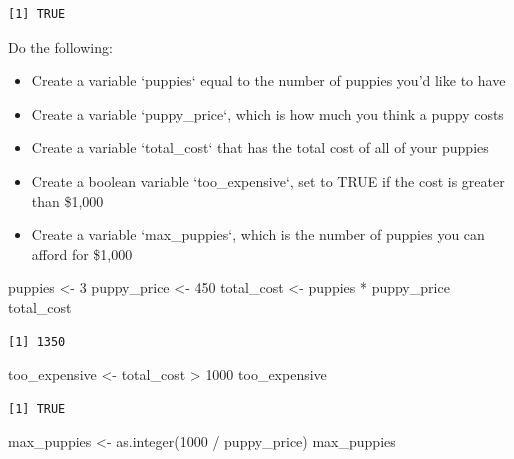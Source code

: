 \documentclass[
  letterpaper,
  DIV=11,
  numbers=noendperiod]{scrartcl}
\newenvironment{Shaded}{\begin{snugshade}}{\end{snugshade}}
\newcommand{\DecValTok}[1]{\textcolor[rgb]{0.68,0.00,0.00}{#1}}
\newcommand{\FunctionTok}[1]{\textcolor[rgb]{0.28,0.35,0.67}{#1}}
\newcommand{\NormalTok}[1]{\textcolor[rgb]{0.00,0.23,0.31}{#1}}
\newcommand{\OtherTok}[1]{\textcolor[rgb]{0.00,0.23,0.31}{#1}}
\newcommand{\SpecialCharTok}[1]{\textcolor[rgb]{0.37,0.37,0.37}{#1}}
\begin{document}
\begin{verbatim}
[1] TRUE
\end{verbatim}

Do the following:

\begin{itemize}
\item
  Create a variable `puppies` equal to the number of puppies you'd like
  to have
\item
  Create a variable `puppy\_price`, which is how much you think a puppy
  costs
\item
  Create a variable `total\_cost` that has the total cost of all of your
  puppies
\item
  Create a boolean variable `too\_expensive`, set to TRUE if the cost is
  greater than \$1,000
\item
  Create a variable `max\_puppies`, which is the number of puppies you
  can afford for \$1,000
\end{itemize}

\begin{Shaded}
\begin{Highlighting}[]
\NormalTok{puppies }\OtherTok{\textless{}{-}} \DecValTok{3}
\NormalTok{puppy\_price }\OtherTok{\textless{}{-}} \DecValTok{450}
\NormalTok{total\_cost }\OtherTok{\textless{}{-}}\NormalTok{ puppies }\SpecialCharTok{*}\NormalTok{ puppy\_price}
\NormalTok{total\_cost}
\end{Highlighting}
\end{Shaded}

\begin{verbatim}
[1] 1350
\end{verbatim}

\begin{Shaded}
\begin{Highlighting}[]
\NormalTok{too\_expensive }\OtherTok{\textless{}{-}}\NormalTok{ total\_cost }\SpecialCharTok{\textgreater{}} \DecValTok{1000}
\NormalTok{too\_expensive}
\end{Highlighting}
\end{Shaded}

\begin{verbatim}
[1] TRUE
\end{verbatim}

\begin{Shaded}
\begin{Highlighting}[]
\NormalTok{max\_puppies }\OtherTok{\textless{}{-}} \FunctionTok{as.integer}\NormalTok{(}\DecValTok{1000} \SpecialCharTok{/}\NormalTok{ puppy\_price)}
\NormalTok{max\_puppies}
\end{Highlighting}
\end{Shaded}
\end{document}
